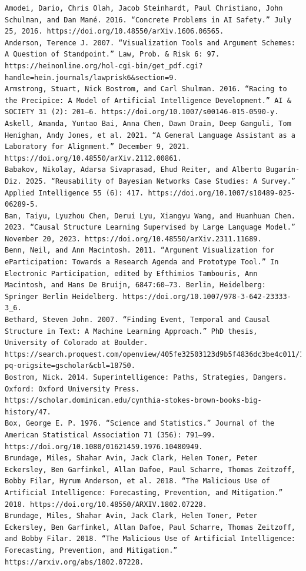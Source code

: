 \documentclass[
  11pt,
  letterpaper,
]{book}
\begin{document}
\begin{verbatim}
Amodei, Dario, Chris Olah, Jacob Steinhardt, Paul Christiano, John Schulman, and Dan Mané. 2016. “Concrete Problems in AI Safety.” July 25, 2016. https://doi.org/10.48550/arXiv.1606.06565.
Anderson, Terence J. 2007. “Visualization Tools and Argument Schemes: A Question of Standpoint.” Law, Prob. & Risk 6: 97. https://heinonline.org/hol-cgi-bin/get_pdf.cgi?handle=hein.journals/lawprisk6&section=9.
Armstrong, Stuart, Nick Bostrom, and Carl Shulman. 2016. “Racing to the Precipice: A Model of Artificial Intelligence Development.” AI & SOCIETY 31 (2): 201–6. https://doi.org/10.1007/s00146-015-0590-y.
Askell, Amanda, Yuntao Bai, Anna Chen, Dawn Drain, Deep Ganguli, Tom Henighan, Andy Jones, et al. 2021. “A General Language Assistant as a Laboratory for Alignment.” December 9, 2021. https://doi.org/10.48550/arXiv.2112.00861.
Babakov, Nikolay, Adarsa Sivaprasad, Ehud Reiter, and Alberto Bugarín-Diz. 2025. “Reusability of Bayesian Networks Case Studies: A Survey.” Applied Intelligence 55 (6): 417. https://doi.org/10.1007/s10489-025-06289-5.
Ban, Taiyu, Lyuzhou Chen, Derui Lyu, Xiangyu Wang, and Huanhuan Chen. 2023. “Causal Structure Learning Supervised by Large Language Model.” November 20, 2023. https://doi.org/10.48550/arXiv.2311.11689.
Benn, Neil, and Ann Macintosh. 2011. “Argument Visualization for eParticipation: Towards a Research Agenda and Prototype Tool.” In Electronic Participation, edited by Efthimios Tambouris, Ann Macintosh, and Hans De Bruijn, 6847:60–73. Berlin, Heidelberg: Springer Berlin Heidelberg. https://doi.org/10.1007/978-3-642-23333-3_6.
Bethard, Steven John. 2007. “Finding Event, Temporal and Causal Structure in Text: A Machine Learning Approach.” PhD thesis, University of Colorado at Boulder. https://search.proquest.com/openview/405fe32503123d9b5f4836dc3be4c011/1?pq-origsite=gscholar&cbl=18750.
Bostrom, Nick. 2014. Superintelligence: Paths, Strategies, Dangers. Oxford: Oxford University Press. https://scholar.dominican.edu/cynthia-stokes-brown-books-big-history/47.
Box, George E. P. 1976. “Science and Statistics.” Journal of the American Statistical Association 71 (356): 791–99. https://doi.org/10.1080/01621459.1976.10480949.
Brundage, Miles, Shahar Avin, Jack Clark, Helen Toner, Peter Eckersley, Ben Garfinkel, Allan Dafoe, Paul Scharre, Thomas Zeitzoff, Bobby Filar, Hyrum Anderson, et al. 2018. “The Malicious Use of Artificial Intelligence: Forecasting, Prevention, and Mitigation.” 2018. https://doi.org/10.48550/ARXIV.1802.07228.
Brundage, Miles, Shahar Avin, Jack Clark, Helen Toner, Peter Eckersley, Ben Garfinkel, Allan Dafoe, Paul Scharre, Thomas Zeitzoff, and Bobby Filar. 2018. “The Malicious Use of Artificial Intelligence: Forecasting, Prevention, and Mitigation.” https://arxiv.org/abs/1802.07228.

\end{verbatim}
\end{document}
